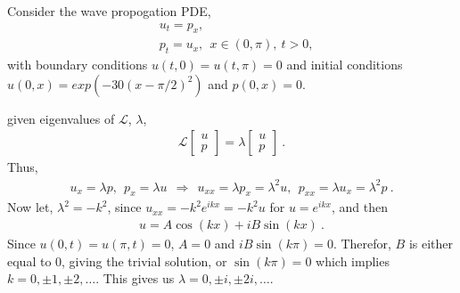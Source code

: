 Consider the wave propogation PDE,
\begin{align*}
& u_t = p_x, \\
&p_t = u_x,~~x \in (0,\pi),~t>0,
\end{align*}
with boundary conditions $u(t,0) = u(t,\pi) = 0$ and initial conditions $u(0,x) = exp(-30(x - \pi / 2)^2)$ and $p(0,x) = 0$.

\begin{questions}

\begin{solution}

given eigenvalues of $\mathcal{L}$, $\lambda$,
\begin{align*}
\mathcal{L}\begin{bmatrix}
u \\ p \end{bmatrix} = \lambda\begin{bmatrix}
u \\ p \end{bmatrix}~.
\end{align*}
Thus,
\begin{align*}
u_x = \lambda p,~~p_x = \lambda u~~\Rightarrow~~u_{xx} = \lambda p_x = \lambda^2 u,~~p_{xx} = \lambda u_x = \lambda^2p~.
\end{align*}
Now let, $\lambda^2 = -k^2$, since $u_{xx} = -k^2e^{ikx} = -k^2u$ for $u = e^{ikx}$, and then
\begin{align*}
u = A\cos(kx)+iB\sin(kx)~.
\end{align*}
Since $u(0,t)=u(\pi,t) = 0$, $A = 0$ and $iB\sin(k\pi) = 0$. Therefor, $B$ is either equal to $0$, giving the trivial solution, or $\sin(k\pi) = 0$ which implies $k = 0, \pm 1, \pm 2, \dots$. This gives us $\lambda = 0, \pm i, \pm 2i, \dots$.


\end{solution}
\end{questions}
